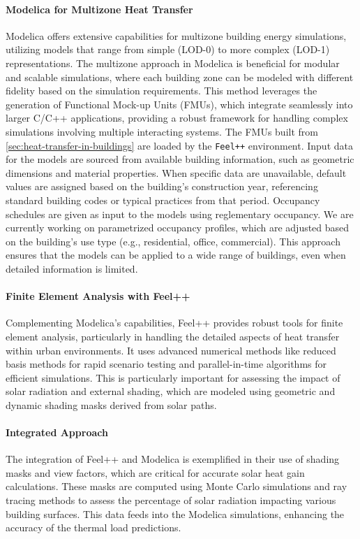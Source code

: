\documentclass[runningheads]{llncs}
\begin{document}
\paragraph{Modelica for Multizone Heat Transfer}
Modelica offers extensive capabilities for multizone building energy simulations, utilizing models that range from simple (LOD-0) to more complex (LOD-1) representations. The multizone approach in Modelica is beneficial for modular and scalable simulations, where each building zone can be modeled with different fidelity based on the simulation requirements. This method leverages the generation of Functional Mock-up Units (FMUs), which integrate seamlessly into larger C/C++ applications, providing a robust framework for handling complex simulations involving multiple interacting systems.
The FMUs built from \cref{sec:heat-transfer-in-buildings} are loaded by the \texttt{Feel++} environment.
Input data for the models are sourced from available building information, such as geometric dimensions and material properties.
When specific data are unavailable, default values are assigned based on the building's construction year, referencing standard building codes or typical practices from that period.
Occupancy schedules are given as input to the models using reglementary occupancy.
We are currently working on parametrized occupancy profiles, which are adjusted based on the building's use type (e.g., residential, office, commercial).
This approach ensures that the models can be applied to a wide range of buildings, even when detailed information is limited.


\paragraph{Finite Element Analysis with Feel++}
Complementing Modelica's capabilities, Feel++ provides robust tools for finite element analysis, particularly in handling the detailed aspects of heat transfer within urban environments. It uses advanced numerical methods like reduced basis methods for rapid scenario testing and parallel-in-time algorithms for efficient simulations. This is particularly important for assessing the impact of solar radiation and external shading, which are modeled using geometric and dynamic shading masks derived from solar paths.

\paragraph{Integrated Approach}
The integration of Feel++ and Modelica is exemplified in their use of shading masks and view factors, which are critical for accurate solar heat gain calculations. These masks are computed using Monte Carlo simulations and ray tracing methods to assess the percentage of solar radiation impacting various building surfaces. This data feeds into the Modelica simulations, enhancing the accuracy of the thermal load predictions.
\end{document}
